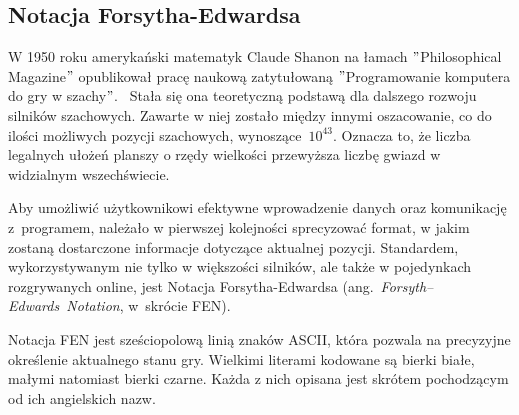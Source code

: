 \subsection{Notacja Forsytha-Edwardsa}
\label{subsec:notacja-fen}


W 1950 roku amerykański matematyk Claude Shanon na łamach \("\)Philosophical Magazine\("\) opublikował pracę naukową zatytułowaną \("\)Programowanie komputera do gry w szachy\("\).~\cite*{Shannon1950XXIIPA}
Stała się ona teoretyczną podstawą dla dalszego rozwoju silników szachowych.
Zawarte w niej zostało między innymi oszacowanie, co do ilości możliwych pozycji szachowych, wynoszące~$10^{43}$.
Oznacza to, że liczba legalnych ułożeń planszy o rzędy wielkości przewyższa liczbę gwiazd w widzialnym wszechświecie.

Aby umożliwić użytkownikowi efektywne wprowadzenie danych oraz komunikację z~programem, należało w pierwszej kolejności sprecyzować format, w jakim zostaną dostarczone informacje dotyczące aktualnej pozycji.
Standardem, wykorzystywanym nie tylko w większości silników, ale także w pojedynkach rozgrywanych online, jest Notacja Forsytha-Edwardsa (ang.~\emph{Forsyth–Edwards~Notation}, w~skrócie FEN).

Notacja FEN jest sześciopolową linią znaków ASCII, która pozwala na precyzyjne określenie aktualnego stanu gry.
Wielkimi literami kodowane są bierki białe, małymi natomiast bierki czarne.
Każda z nich opisana jest skrótem pochodzącym od ich angielskich nazw.

